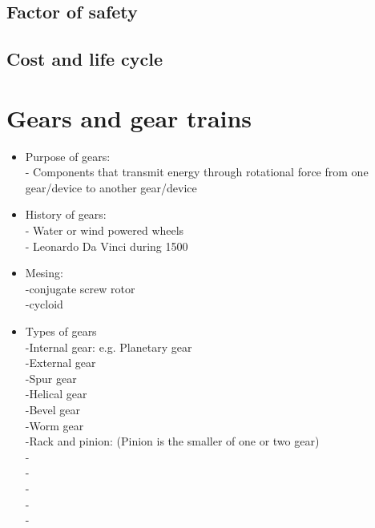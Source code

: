 \documentclass[11pt]{article}
\begin{document}
\subsection*{Factor of safety}
\subsection*{Cost and life cycle}
\section*{Gears and gear trains}
\begin{itemize}
    \item Purpose of gears:
    \\
    - Components that transmit energy through rotational force from one gear/device to another gear/device
    \item History of gears:
    \\
    - Water or wind powered wheels
    \\- Leonardo Da Vinci during 1500
    \item Mesing:
    \\
    -conjugate screw rotor
    \\-cycloid
    \item Types of gears
    \\-Internal gear: e.g. Planetary gear
    \\-External gear
    \\-Spur gear
    \\-Helical gear
    \\-Bevel gear
    \\-Worm gear
    \\-Rack and pinion: (Pinion is the smaller of one or two gear)
    \\-
    \\-
    \\-
    \\-
    \\-
\end{itemize}
\end{document}
